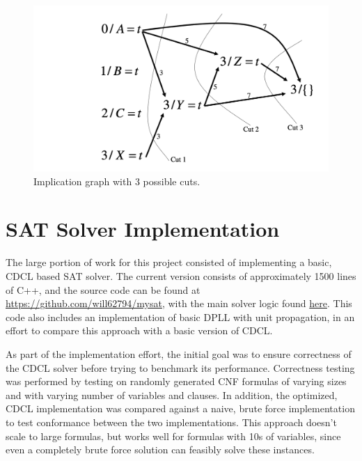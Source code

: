 \documentclass[12pt]{article}
\begin{document}
\begin{figure}
    \begin{center}
        \includegraphics[scale=0.4]{figures/impl-graph.png}
    \end{center}
    \label{fig:impl-graph}
    \caption{Implication graph with 3 possible cuts.}
\end{figure}

\section{SAT Solver Implementation}

The large portion of work for this project consisted of implementing a basic, CDCL based SAT solver. The current version consists of approximately 1500 lines of C++, and the source code can be found at \url{https://github.com/will62794/mysat}, with the main solver logic found \href{https://github.com/will62794/mysat/blob/b721cb133098fd795219caa115cbae1cedf95ee2/sat.cpp}{here}. This code also includes an implementation of basic DPLL with unit propagation, in an effort to compare this approach with a basic version of CDCL.

As part of the implementation effort, the initial goal was to ensure correctness of the CDCL solver before trying to benchmark its performance. Correctness testing was performed by testing on randomly generated CNF formulas of varying sizes and with varying number of variables and clauses. In addition, the optimized, CDCL implementation was compared against a naive, brute force implementation to test conformance between the two implementations. This approach doesn't scale to large formulas, but works well for formulas with 10s of variables, since even a completely brute force solution can feasibly solve these instances.
\end{document}
